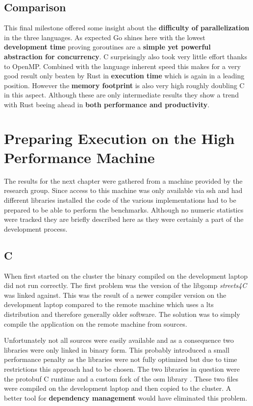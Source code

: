 \subsection{Comparison}
\label{subsec:Implementation::ParallelBenchmark::Comparison}

This final milestone offered some insight about the \textbf{difficulty of parallelization} in the three languages. As expected Go shines here with the lowest \textbf{development time} proving \glspl{goroutine} are a \textbf{simple yet powerful abstraction for concurrency}. C surprisingly also took very little effort thanks to OpenMP. Combined with the language inherent speed this makes for a very good result only beaten by Rust in \textbf{execution time} which is again in a leading position. However the \textbf{memory footprint} is also very high roughly doubling C in this aspect. Although these are only intermediate results they show a trend with Rust beeing ahead in \textbf{both performance and productivity}.

\section{Preparing Execution on the High Performance Machine}
\label{sec:Implementation::ClusterPreparation}

The results for the next chapter were gathered from a machine provided by the research group. Since access to this machine was only available via \gls{ssh} and had different libraries installed the code of the various implementations had to be prepared to be able to perform the benchmarks. Although no numeric statistics were tracked they are briefly described here as they were certainly a part of the development process.

\subsection*{C}
\label{subsec:Implementation::ClusterPreparation::C}

When first started on the cluster the binary compiled on the development laptop did not run correctly. The first problem was the version of the libgomp \textit{streets4C} was linked against. This was the result of a newer compiler version on the development laptop compared to the remote machine which uses a \gls{lts} distribution and therefore generally older software. The solution was to simply compile the application on the remote machine from sources.

Unfortunately not all sources were easily available and as a consequence two libraries were only linked in binary form. This probably introduced a small performance penalty as the libraries were not fully optimized but due to time restrictions this approach had to be chosen. The two libraries in question were the \gls{protobuf} C runtime  and a custom fork of the \gls{osm} library . These two files were compiled on the development laptop and then copied to the cluster. A better tool for \textbf{dependency management} would have eliminated this problem.

